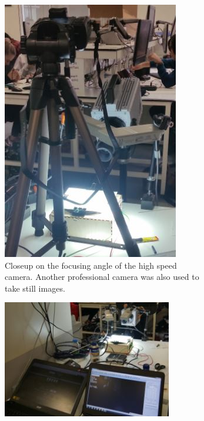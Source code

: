 \begin{figure}[ht]
    \begin{subfigure}[t]{0.475\textwidth}
        \centering
        \includegraphics[width=\textwidth]{prototype/exp_rep_imgs/closeup_highspeedcamera.jpg}
        \caption{Closeup on the focusing angle of the high speed camera. Another professional camera was also used to take still images.}
        \label{fig:closeup_highspeedcamera}
    \end{subfigure}
    \begin{subfigure}[t]{0.475\textwidth}
        \centering
        \includegraphics[width=\textwidth]{prototype/exp_rep_imgs/software_highspeedcamera.jpg}

\end{subfigure}
\end{figure}
